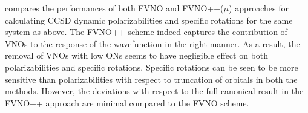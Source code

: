 compares the performances of both FVNO and FVNO++($\mu$) approaches
for calculating CCSD dynamic polarizabilities and specific rotations for the same system 
as above. The FVNO++ scheme indeed captures the contribution of VNOs to
the response of the wavefunction in the right manner. As a result, the removal of VNOs with low ONs
seems to have negligible effect on both polarizabilities and specific rotations.
Specific rotations can be seen to be more sensitive than polarizabilities with respect to 
truncation of orbitals in both the methods. However, the deviations with respect to 
the full canonical result in the FVNO++ approach are minimal compared to the 
FVNO scheme.
